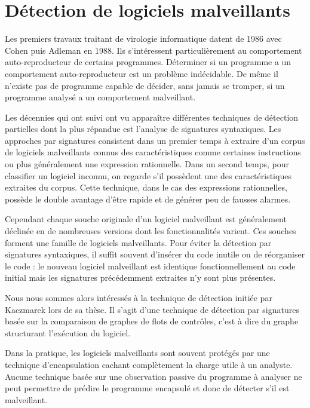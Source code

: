 \section{Détection de logiciels malveillants}
Les premiers travaux traitant de virologie informatique datent de 1986 avec Cohen \cite{Cohen86} puis Adleman \cite{Adleman88} en 1988. Ils s'intéressent particulièrement au comportement auto-reproducteur de certains programmes. Déterminer si un programme a un comportement auto-reproducteur est un problème indécidable. De même il n'existe pas de programme capable de décider, sans jamais se tromper, si un programme analysé a un comportement malveillant.

Les décennies qui ont suivi ont vu apparaître différentes techniques de détection partielles dont la plus répandue est l'analyse de signatures syntaxiques. Les approches par signatures consistent dans un premier temps à extraire d'un corpus de logiciels malveillants connus des caractéristiques comme certaines instructions ou plus généralement une expression rationnelle. Dans un second temps, pour classifier un logiciel inconnu, on regarde s'il possèdent une des caractéristiques extraites du corpus.
Cette technique, dans le cas des expressions rationnelles, possède le double avantage d'être rapide et de générer peu de fausses alarmes.

Cependant chaque souche originale d'un logiciel malveillant est généralement déclinée en de nombreuses versions dont les fonctionnalités varient. Ces souches forment une famille de logiciels malveillants. Pour éviter la détection par signatures syntaxiques, il suffit souvent d'insérer du code inutile ou de réorganiser le code : le nouveau logiciel malveillant est identique fonctionnellement au code initial mais les signatures précédemment extraites n'y sont plus présentes.

Nous nous sommes alors intéressés à la technique de détection initiée par Kaczmarek \cite{BKM08} lors de sa thèse. Il s'agit d'une technique de détection par signatures basée sur la comparaison de graphes de flots de contrôles, c'est à dire du graphe structurant l'exécution du logiciel.

Dans la pratique, les logiciels malveillants sont souvent protégés par une technique d'encapsulation cachant complètement la charge utile à un analyste.
Aucune technique basée sur une observation passive du programme à analyser ne peut permettre de prédire le programme encapsulé et donc de détecter s'il est malveillant.

